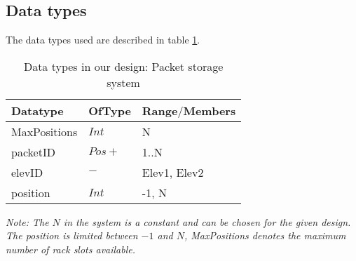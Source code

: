 \subsection*{Data types}
The data types used are described in table \ref{tab: data_types}.
\begin{table}[h]
\centering
\begin{tabular}{|l|l|l|}\hline
Datatype & OfType & Range$\slash$Members\\\hline
MaxPositions & $Int$ & { N} \\\hline
packetID & $Pos+$ & { 1..N} \\\hline
elevID & $ - $ & { Elev1, Elev2}\\\hline
position & $Int$ & { -1, N}\\\hline
\end{tabular}
\caption{Data types in our design: Packet storage system }
\label{tab: data_types}
\end{table}

\textit{Note: The $N$ in the system is a constant and can be chosen for the given design. The position is limited between $-1$ and $N$, \textit{MaxPositions} denotes the maximum number of rack slots available.}